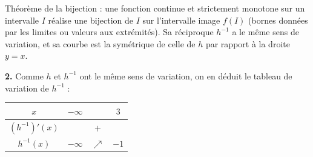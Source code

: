\documentclass[11pt]{article}
\begin{document}
\begin{rappel}
Théorème de la bijection : une fonction continue et strictement
monotone sur un intervalle $I$ réalise une bijection de $I$ sur
l'intervalle image $f(I)$ (bornes données par les limites ou valeurs
aux extrémités). Sa réciproque $h^{-1}$ a le même sens de variation, et
sa courbe est la symétrique de celle de $h$ par rapport à la droite
$y = x$.
\end{rappel}

\textbf{2.} Comme $h$ et $h^{-1}$ ont le même sens de variation, on en déduit le tableau de variation de $h^{-1}$ :
\begin{center}\renewcommand{\arraystretch}{1.4}
\begin{tabular}{|c|ccc|}
\hline
$x$ & $-\infty$ & & $3$ \\
\hline
$(h^{-1})'(x)$ & & $+$ & \\
\hline
$h^{-1}(x)$ & $-\infty$ & $\nearrow$ & $-1$ \\
\hline
\end{tabular}
\end{center}
\end{document}
